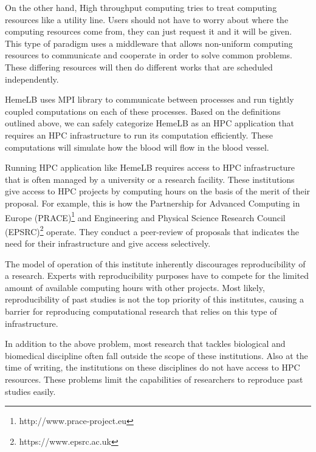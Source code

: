 On the other hand, High throughput computing tries to treat computing resources like a utility line. Users should not have to worry about where the computing resources come from, they can just request it and it will be given. This type of paradigm uses a middleware that allows non-uniform computing resources to communicate and cooperate in order to solve common problems\citep{Micro31:online}. These differing resources will then do different works that are scheduled independently. 

HemeLB uses MPI library to communicate between processes and run tightly coupled computations on each of these processes. Based on the definitions outlined above, we can safely categorize HemeLB as an HPC application that requires an HPC infrastructure to run its computation efficiently. These computations will simulate how the blood will flow in the blood vessel.

Running HPC application like HemeLB requires access to HPC infrastructure that is often managed by a university or a research facility. These institutions give access to HPC projects by computing hours on the basis of the merit of their proposal. For example, this is how the Partnership for Advanced Computing in Europe (PRACE)\footnote{http://www.prace-project.eu} and Engineering and Physical Science Research Council (EPSRC)\footnote{https://www.epsrc.ac.uk} operate. They conduct a peer-review of proposals that indicates the need for their infrastructure and give access selectively.

The model of operation of this institute inherently discourages reproducibility of a research. Experts with reproducibility purposes have to compete for the limited amount of available computing hours with other projects. Most likely, reproducibility of past studies is not the top priority of this institutes, causing a barrier for reproducing computational research that relies on this type of infrastructure.


In addition to the above problem, most research that tackles biological and biomedical discipline often fall outside the scope of these institutions. Also at the time of writing, the institutions on these disciplines do not have access to HPC resources. These problems limit the capabilities of researchers to reproduce past studies easily. 


